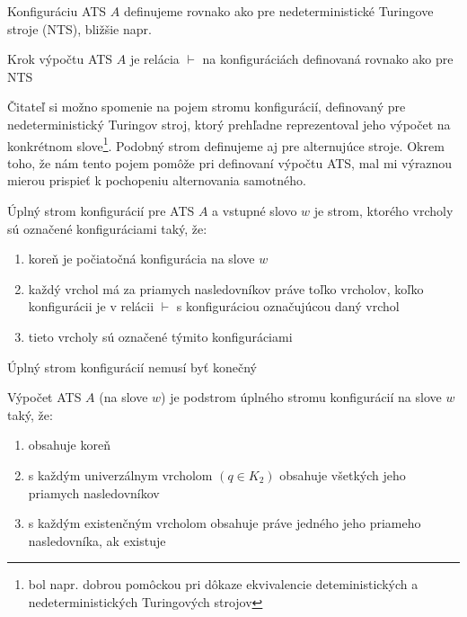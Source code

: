 \begin{definicia}
  Konfiguráciu ATS $A$ definujeme rovnako ako pre nedeterministické
  Turingove stroje (NTS), bližšie napr. \cite{Hopc}
\end{definicia}

\begin{definicia}
  Krok výpočtu ATS $A$ je relácia $\vdash$ na konfiguráciách
  definovaná rovnako ako pre NTS
\end{definicia}

Čitateľ si možno spomenie na pojem stromu konfigurácií, definovaný
pre nedeterministický Turingov stroj, ktorý prehľadne
reprezentoval jeho výpočet na konkrétnom slove\footnote{bol napr.
dobrou pomôckou pri dôkaze ekvivalencie deteministických a
nedeterministických Turingových strojov}. Podobný strom definujeme
aj pre alternujúce stroje. Okrem toho, že nám tento pojem pomôže
pri definovaní výpočtu ATS, mal mi výraznou mierou prispieť k
pochopeniu alternovania samotného.

\begin{definicia}
  Úplný strom konfigurácií pre ATS $A$ a vstupné slovo $w$ je strom,
  ktorého vrcholy sú označené konfiguráciami taký, že:
  \begin{enumerate}
    \item koreň je počiatočná konfigurácia na slove $w$
    \item každý vrchol má za priamych nasledovníkov práve toľko
      vrcholov, koľko konfigurácii je v relácii $\vdash$ s konfiguráciou
      označujúcou daný vrchol
    \item tieto vrcholy sú označené týmito konfiguráciami
  \end{enumerate}
\end{definicia}

\begin{poznamka}
  Úplný strom konfigurácií nemusí byť konečný
\end{poznamka}

\begin{definicia}
  Výpočet ATS $A$ (na slove $w$) je podstrom úplného stromu
  konfigurácií na slove $w$ taký, že:
  \begin{enumerate}
    \item obsahuje koreň
    \item s každým univerzálnym vrcholom $(q\in K_2)$ obsahuje
      všetkých jeho priamych nasledovníkov
    \item s každým existenčným vrcholom obsahuje práve jedného jeho
      priameho nasledovníka, ak existuje
  \end{enumerate}
\end{definicia}

